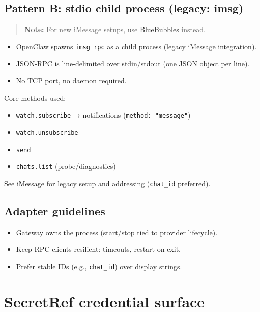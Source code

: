 \subsection{Pattern B: stdio child process (legacy: imsg)}


\begin{quote}
\textbf{Note:} For new iMessage setups, use \href{/channels/bluebubbles}{BlueBubbles} instead.
\end{quote}


\begin{itemize}
  \item OpenClaw spawns \texttt{imsg rpc} as a child process (legacy iMessage integration).
  \item JSON-RPC is line-delimited over stdin/stdout (one JSON object per line).
  \item No TCP port, no daemon required.
\end{itemize}


Core methods used:

\begin{itemize}
  \item \texttt{watch.subscribe} → notifications (\texttt{method: "message"})
  \item \texttt{watch.unsubscribe}
  \item \texttt{send}
  \item \texttt{chats.list} (probe/diagnostics)
\end{itemize}


See \href{/channels/imessage}{iMessage} for legacy setup and addressing (\texttt{chat\_id} preferred).

\subsection{Adapter guidelines}


\begin{itemize}
  \item Gateway owns the process (start/stop tied to provider lifecycle).
  \item Keep RPC clients resilient: timeouts, restart on exit.
  \item Prefer stable IDs (e.g., \texttt{chat\_id}) over display strings.
\end{itemize}



\clearpage

\section{SecretRef credential surface}


